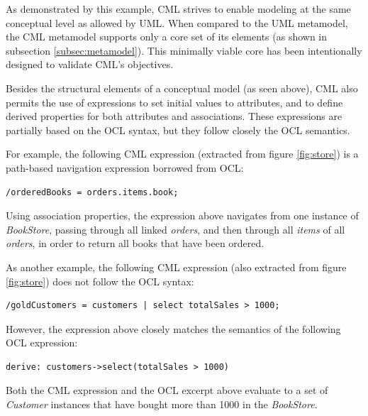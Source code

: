 As demonstrated by this example,
CML strives to enable modeling at the same conceptual level as allowed by UML.
When compared to the UML metamodel,
the CML metamodel supports only a core set of its elements (as shown in subsection \ref{subsec:metamodel}).
This minimally viable core has been intentionally designed to validate CML's objectives.

Besides the structural elements of a conceptual model (as seen above),
CML also permits the use of expressions to set initial values to attributes,
and to define derived properties for both attributes and associations.
These expressions are partially based on the OCL \cite{ocl} syntax,
but they follow closely the OCL semantics.

For example, the following CML expression (extracted from figure \ref{fig:store}) is a path-based navigation expression borrowed from OCL:

\verbatimfont{\small}
\begin{verbatim}
/orderedBooks = orders.items.book;
\end{verbatim}

Using association properties, the expression above navigates from one instance of \emph{BookStore}, passing through all linked \emph{orders}, and then through all \emph{items} of all \emph{orders}, in order to return all books that have been ordered. 

As another example,
the following CML expression (also extracted from figure \ref{fig:store}) does not follow the OCL syntax:

\verbatimfont{\small}
\begin{verbatim}
/goldCustomers = customers | select totalSales > 1000;
\end{verbatim}

However, the expression above closely matches the semantics of the following OCL expression:

\verbatimfont{\small}
\begin{verbatim}
derive: customers->select(totalSales > 1000)
\end{verbatim}

Both the CML expression and the OCL excerpt above evaluate to a set of \emph{Customer} instances
that have bought more than 1000 in the \emph{BookStore}. 
 